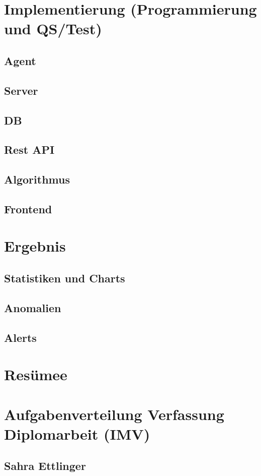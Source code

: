 \documentclass[pdftex,11pt,a4paper,oneside]{book}
\begin{document}
\chapter{Implementierung (Programmierung und QS/Test)}
\section{Agent}
\section{Server}
\section{DB}
\section{Rest API}
\section{Algorithmus}
\section{Frontend}

\chapter{Ergebnis}
\section{Statistiken und Charts}
\section{Anomalien}
\section{Alerts}


\chapter{Resümee}

\chapter{Aufgabenverteilung Verfassung Diplomarbeit (IMV)}
\section{Sahra Ettlinger}
\end{document}
